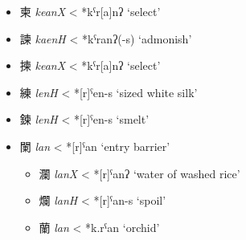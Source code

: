 \begin{itemize}
\item {\Large{柬}} %
\textit{keanX} < *kˁr[a]nʔ `select' %

\item {\Large{諫}} %
\textit{kaenH} < *kˁranʔ(-s) `admonish' %

\item {\Large{揀}} %
\textit{keanX} < *kˁr[a]nʔ `select' %



\item {\Large{練}} %
\textit{lenH} < *[r]ˁen-s `sized white silk' 


\item {\Large{鍊}} %
\textit{lenH} < *[r]ˁen-s `smelt' %


\item {\Large{闌}} %
\textit{lan} < *[r]ˁan `entry barrier' %

\begin{itemize}


\item {\Large{瀾}} %
\textit{lanX} < *[r]ˁanʔ `water of washed rice'  %

\item {\Large{爛}} %
\textit{lanH} < *[r]ˁan-s `spoil' %


\item {\Large{蘭}} %
\textit{lan} < *k.rˁan `orchid' %


\end{itemize}
\end{itemize}

